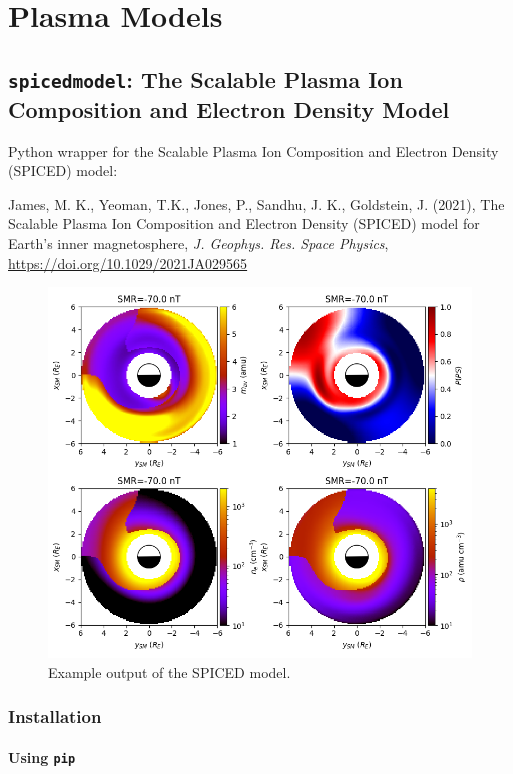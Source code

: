 \chapter{Plasma Models}

	\section{\texttt{spicedmodel}: The Scalable Plasma Ion Composition and Electron Density Model}

		Python wrapper for the Scalable Plasma Ion Composition and Electron Density (SPICED) model:

		James, M. K., Yeoman, T.K., Jones, P., Sandhu, J. K., Goldstein, J. (2021), The Scalable Plasma Ion Composition and Electron Density (SPICED) model for Earth's inner magnetosphere, \emph{J. Geophys. Res. Space Physics},  \url{https://doi.org/10.1029/2021JA029565}

		\begin{figure}[h]
			\centering
			\includegraphics[width=0.9\linewidth]{figures/ch2_spicedmodel.png}
			\caption{Example output of the SPICED model.}
		\end{figure}

		\subsection{Installation}

			\subsubsection{Using \texttt{pip}}

